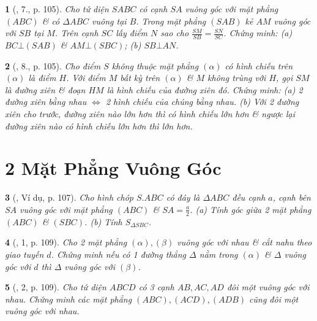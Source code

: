 \documentclass{article}
\newtheorem{baitoan}{}
\begin{document}
\begin{baitoan}[\cite{SGK_Toan_11_hinh_hoc_co_ban}, 7., p. 105]
	Cho tứ diện $SABC$ có cạnh $SA$ vuông góc với mặt phẳng $(ABC)$ \& có $\Delta ABC$ vuông tại $B$. Trong mặt phẳng $(SAB)$ kẻ $AM$ vuông góc với $SB$ tại $M$. Trên cạnh $SC$ lấy điểm $N$ sao cho $\frac{SM}{SB} = \frac{SN}{SC}$. Chứng minh: (a) $BC\bot(SAB)$ \& $AM\bot(SBC)$; (b) $SB\bot AN$.
\end{baitoan}

\begin{baitoan}[\cite{SGK_Toan_11_hinh_hoc_co_ban}, 8., p. 105]
	Cho điểm $S$ không thuộc mặt phẳng $(\alpha)$ có hình chiếu trên $(\alpha)$ là điểm $H$. Với điểm $M$ bất kỳ trên $(\alpha)$ \& $M$ không trùng với $H$, gọi $SM$ là đường xiên \& đoạn $HM$ là hình chiếu của đường xiên đó. Chứng minh: (a) 2 đường xiên bằng nhau $\Leftrightarrow$ 2 hình chiếu của chúng bằng nhau. (b) Với 2 đường xiên cho trước, đường xiên nào lớn hơn thì có hình chiếu lớn hơn \& ngược lại đường xiên nào có hình chiếu lớn hơn thì lớn hơn.
\end{baitoan}


\section{2 Mặt Phẳng Vuông Góc}

\begin{baitoan}[\cite{SGK_Toan_11_hinh_hoc_co_ban}, Ví dụ, p. 107]
	Cho hình chóp $S.ABC$ có đáy là $\Delta ABC$ đều cạnh $a$, cạnh bên $SA$ vuông góc với mặt phẳng $(ABC)$ \& $SA = \frac{a}{2}$. (a) Tính góc giữa 2 mặt phẳng $(ABC)$ \& $(SBC)$. (b) Tính $S_{\Delta SBC}$.
\end{baitoan}

\begin{baitoan}[\cite{SGK_Toan_11_hinh_hoc_co_ban}, 1, p. 109]
	Cho 2 mặt phẳng $(\alpha),(\beta)$ vuông góc với nhau \& cắt nahu theo giao tuyến $d$. Chứng minh nếu có 1 đường thẳng $\Delta$ nằm trong $(\alpha)$ \& $\Delta$ vuông góc với $d$ thì $\Delta$ vuông góc với $(\beta)$.
\end{baitoan}

\begin{baitoan}[\cite{SGK_Toan_11_hinh_hoc_co_ban}, 2, p. 109]
	Cho tứ diện $ABCD$ có 3 cạnh $AB,AC,AD$ đôi một vuông góc với nhau. Chứng minh các mặt phẳng $(ABC),(ACD),(ADB)$ cũng đôi một vuông góc với nhau.
\end{baitoan}
\end{document}
